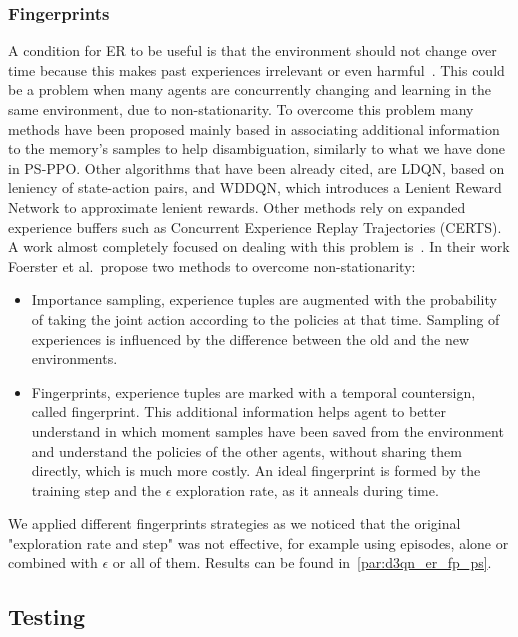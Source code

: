 \documentclass[11pt, a4paper, hidelinks]{report}
\begin{document}
\subsubsection{Fingerprints}\label{subsubsec:fingerprints}

A condition for ER to be useful is that the environment should not change over time because this makes past experiences irrelevant
or even harmful~\citep{Hernandez-Leal-2019}.
This could be a problem when many agents are concurrently changing and learning in the same environment, due to non-stationarity.
To overcome this problem many methods have been proposed mainly based in associating additional information to the memory's samples to help disambiguation, similarly to what we have done in PS-PPO\@.
Other algorithms that have been already cited, are LDQN, based on leniency of state-action pairs, and WDDQN, which introduces a Lenient Reward Network to approximate lenient rewards.
Other methods rely on expanded experience buffers such as Concurrent Experience Replay Trajectories (CERTS).
A work almost completely focused on dealing with this problem is~\citep{fingerprints}.
In their work Foerster et al.~propose two methods to overcome non-stationarity:
\begin{itemize}
	\item Importance sampling, experience tuples are augmented with the probability of taking the joint action according to the policies at that time.
Sampling of experiences is influenced by the difference between the old and the new environments.
	\item Fingerprints, experience tuples are marked with a temporal countersign, called fingerprint.
This additional information helps agent to better understand in which moment samples have been saved from the environment and understand the policies of the other agents, without sharing them directly, which is much more costly.
An ideal fingerprint is formed by the training step and the $\epsilon$ exploration rate, as it anneals during time.
\end{itemize}

We applied different fingerprints strategies as we noticed that the original "exploration rate and step" was not effective, for example using episodes, alone or combined with $\epsilon$ or all of them.
Results can be found in~\ref{par:d3qn_er_fp_ps}.

\subsection{Testing}\label{subsec:testing2}
\end{document}
